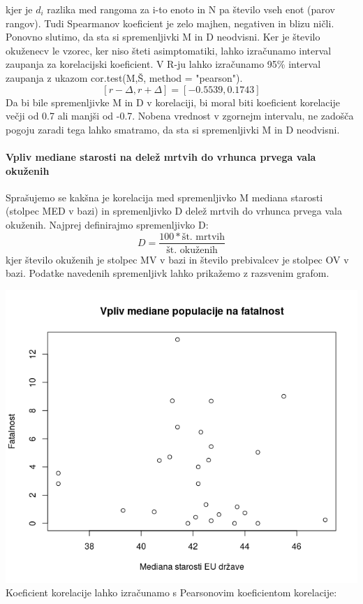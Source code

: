 \documentclass[a4paper,11pt]{article}
\begin{document}
kjer je \( d_i \) razlika med rangoma za i-to enoto in N pa število vseh enot (parov rangov). Tudi Spearmanov koeficient je zelo majhen, negativen in blizu ničli. Ponovno slutimo, da sta si spremenljivki M in D neodvisni.
Ker je število okuženecv le vzorec, ker niso šteti asimptomatiki, lahko izračunamo interval zaupanja za korelacijski koeficient. V R-ju lahko izračunamo 95\% interval zaupanja z ukazom cor.test(M,Š, method = "pearson").
\[[r - \Delta, r + \Delta] = [-0.5539, 0.1743]\]
Da bi bile spremenljivke M in D v korelaciji, bi moral biti koeficient korelacije večji od 0.7 ali manjši od -0.7. Nobena vrednost v zgornejm intervalu, ne zadošča pogoju zaradi tega lahko smatramo, da sta si spremenljivki M in D neodvisni.

\paragraph{Vpliv mediane starosti na delež mrtvih do vrhunca prvega vala okuženih}
Sprašujemo se kakšna je korelacija med spremenljivko M mediana starosti (stolpec MED v bazi) in spremenljivko D delež mrtvih do vrhunca prvega vala okuženih. Najprej definirajmo spremenljivko D:
\[D = \frac{100 * \text{št. mrtvih}}{\text{št. okuženih}}\]
kjer število okuženih je stolpec MV v bazi in število prebivalcev je stolpec OV v bazi. Podatke navedenih spremenljivk lahko prikažemo z razsvenim grafom.

\includegraphics[scale=0.6]{vpliv_med_pop_na_fatalnost}
Koeficient korelacije lahko izračunamo s Pearsonovim koeficientom korelacije:
\end{document}
